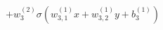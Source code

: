 \documentclass[preview]{standalone}
\begin{document}
\begin{align*}
+ w_3^{(2)} \sigma(w_{3,1}^{(1)}x + w_{3,2}^{(1)}y +b_3^{(1)})
\end{align*}
\end{document}
